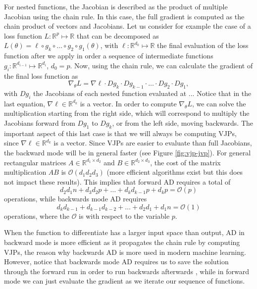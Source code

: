 For nested functions, the Jacobian is described as the product of multiple Jacobian using the chain rule.
In this case, the full gradient is computed as the chain product of vectors and Jacobians. 
Let us consider for example the case of a loss function $L : \mathbb R^p \mapsto \mathbb R$ that can be decomposed as $L(\theta) = \ell \circ g_{k} \circ \ldots \circ g_2 \circ g_1(\theta)$, with $\ell : \mathbb R^{d_k} \mapsto \mathbb R$ the final evaluation of the loss function after we apply in order a sequence of intermediate functions $g_i : \mathbb R^{d_{i-1}} \mapsto \mathbb R^{d_i}$, $d_0 = p$. 
Now, using the chain rule, we can calculate the gradient of the final loss function as
\begin{equation}
 \nabla_\theta L = \nabla \ell \cdot Dg_{k} \cdot Dg_{k-1} \cdot \ldots \cdot Dg_2 \cdot Dg_1, 
\end{equation}
with $Dg_i$ the Jacobians of each nested function evaluated at ... 
Notice that in the last equation, $\nabla \ell \in \mathbb R^{d_k}$ is a vector.
In order to compute $\nabla_\theta L$, we can solve the multiplication starting from the right side, which will correspond to multiply the Jacobians forward from $Dg_1$ to $Dg_k$, or from the left side, moving backwards. 
The important aspect of this last case is that we will always be computing VJPs, since $\nabla \ell \in \mathbb R^{d_k}$ is a vector.
Since VJPs are easier to evaluate than full Jacobians, the backward mode will be in general faster (see Figure \ref{fig:vjp-jvp}). 
For general rectangular matrices $A\in \mathbb R^{d_1 \times d_2}$ and $B \in \mathbb R^{d_2 \times d_3}$, the cost of the matrix multiplication $AB$ is $\mathcal O (d_1 d_2 d_3)$ (more efficient algorithms exist but this does not impact these results). This implies that forward AD requires a total of
\begin{equation}
 d_2 d_1 n + d_3 d_2 p + \ldots + d_k d_{k-1} p + d_k p = \mathcal O (p)
\end{equation}
operations, while backwards mode AD requires
\begin{equation}
 d_k d_{k-1} + d_{k-1} d_{k-2} + \ldots + d_2 d_1 + d_1 n = \mathcal O (1)
\end{equation}
operations, where the $\mathcal O$ is with respect to the variable $p$. 

When the function to differentiate has a larger input space than output, AD in backward mode is more efficient as it propagates the chain rule by computing VJPs, the reason why backwards AD is more used in modern machine learning.
However, notice that backwards mode AD requires us to save the solution through the forward run in order to run backwards afterwards \cite{Bennett_1973}, while in forward mode we can just evaluate the gradient as we iterate our sequence of functions. 

